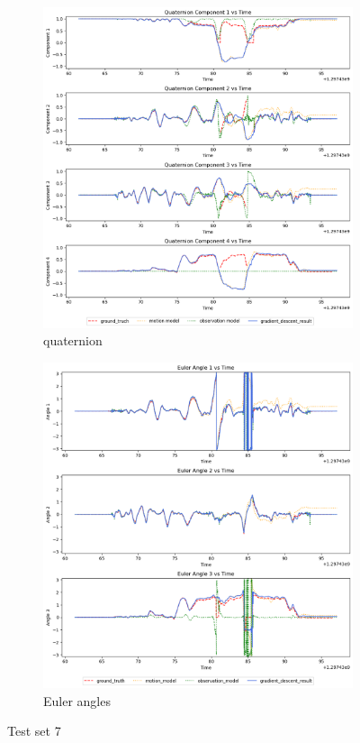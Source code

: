\documentclass[conference]{IEEEtran}
\begin{document}
\begin{figure}[h]
    \centering
    \begin{subfigure}{0.4\textwidth}
        \includegraphics[width=\linewidth]{../img/7_qt.png}
        \caption{quaternion}
    \end{subfigure}
    \hfill
    \begin{subfigure}{0.4\textwidth}
        \includegraphics[width=\linewidth]{../img/7_ea.png}
        \caption{Euler angles}
    \end{subfigure}
    \caption{Test set 7}
    \label{fig:set7}
\end{figure}
\end{document}
